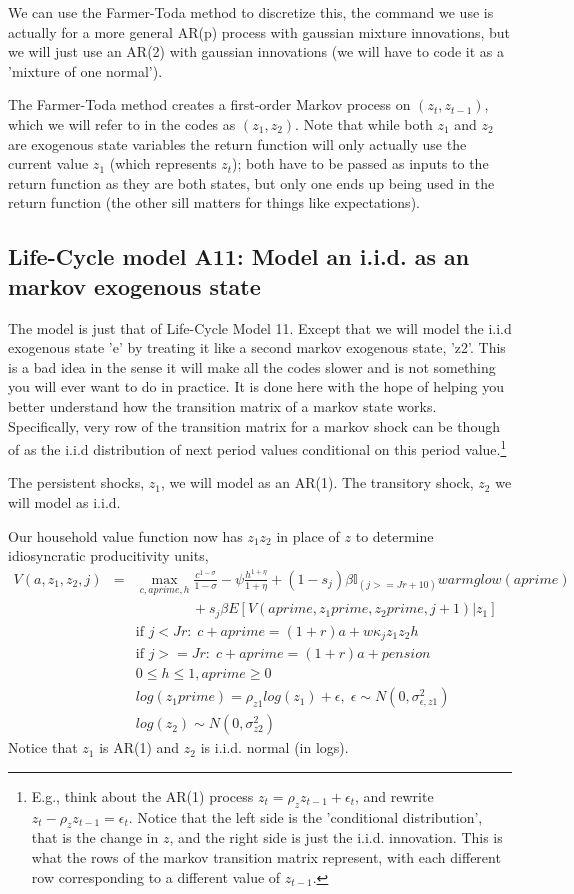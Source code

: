 We can use the Farmer-Toda method to discretize this, the command we use is actually for a more general AR(p) process with gaussian mixture innovations, but we will just use an AR(2) with gaussian innovations (we will have to code it as a 'mixture of one normal').

The Farmer-Toda method creates a first-order Markov process on $(z_t,z_{t-1})$, which we will refer to in the codes as $(z_1,z_2)$. Note that while both $z_1$ and $z_2$ are exogenous state variables the return function will only actually use the current value $z_1$ (which represents $z_t$); both have to be passed as inputs to the return function as they are both states, but only one ends up being used in the return function (the other sill matters for things like expectations).


\subsection{Life-Cycle model A11: Model an i.i.d. as an markov exogenous state}
The model is just that of Life-Cycle Model 11. Except that we will model the i.i.d exogenous state 'e' by treating it like a second markov exogenous state, 'z2'. This is a bad idea in the sense it will make all the codes slower and is not something you will ever want to do in practice. It is done here with the hope of helping you better understand how the transition matrix of a markov state works. Specifically, very row of the transition matrix for a markov shock can be though of as the i.i.d distribution of next period values conditional on this period value.\footnote{E.g., think about the AR(1) process $z_t= \rho_z z_{t-1} + \epsilon_t$, and rewrite $z_t-\rho_z z_{t-1}=\epsilon_t$. Notice that the left side is the 'conditional distribution', that is the change in $z$, and the right side is just the i.i.d. innovation. This is what the rows of the markov transition matrix represent, with each different row corresponding to a different value of $z_{t-1}$.}

The persistent shocks, $z_1$, we will model as an AR(1). The transitory shock, $z_2$ we will model as i.i.d.

Our household value function now has $z_1 z_2$ in place of $z$ to determine idiosyncratic producitivity units,
\begin{eqnarray*}
 V(a,z_1,z_2,j)&=& \max_{c,aprime,h} \frac{c^{1-\sigma}}{1-\sigma} - \psi \frac{h^{1+\eta}}{1+\eta} + (1-s_j)\beta  \mathbb{I}_{(j>=Jr+10)} warmglow(aprime) \\
 && \quad \quad \quad \quad+ s_j \beta E[V(aprime,z_1prime,z_2prime,j+1)|z_1] \\
&& \text{if }j<Jr: \; c+aprime=(1+r)a+w \kappa_j  z_1 z_2 h \\
&& \text{if }j>=Jr: \; c+aprime=(1+r)a +pension\\
&& 0\leq h \leq 1, aprime\geq 0 \\
&& log(z_1prime)=\rho_{z1} log(z_1) + \epsilon, \; \epsilon \sim N(0,\sigma_{\epsilon,z1}^2) \\
&& log(z_2) \sim N(0,\sigma_{z2}^2)
\end{eqnarray*}
Notice that $z_1$ is AR(1) and $z_2$ is i.i.d. normal (in logs).

